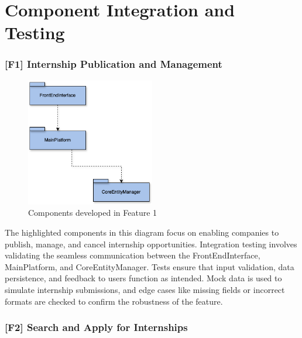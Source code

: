 \section{Component Integration and Testing}

\subsubsection{[F1] Internship Publication and Management}

\begin{figure}[H]
    \centering
    \includegraphics[width=0.5\textwidth]{Images/implementation-testing-hierarchy_f1.png}
    \caption{Components developed in Feature 1}
    \label{fig:implementation_testing_f1}
\end{figure}

The highlighted components in this diagram focus on enabling companies to publish, manage, and cancel internship opportunities. Integration testing involves validating the seamless communication between the FrontEndInterface, MainPlatform, and CoreEntityManager. Tests ensure that input validation, data persistence, and feedback to users function as intended. Mock data is used to simulate internship submissions, and edge cases like missing fields or incorrect formats are checked to confirm the robustness of the feature.

\subsubsection{[F2] Search and Apply for Internships}

